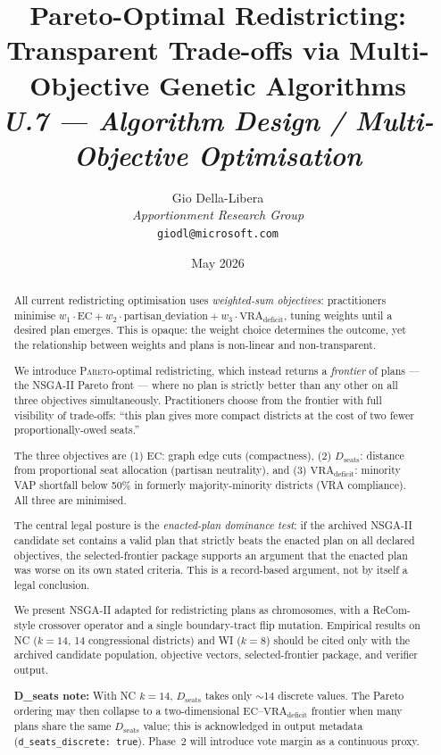 \documentclass[12pt]{article}
\title{%
  \textbf{Pareto-Optimal Redistricting:}\\
  \textbf{Transparent Trade-offs via Multi-Objective Genetic Algorithms}\\[0.8em]
  \normalsize\textit{U.7 --- Algorithm Design / Multi-Objective Optimisation}%
}
\author{%
  Gio Della-Libera\\
  \textit{Apportionment Research Group}\\
  \small\texttt{giodl@microsoft.com}
}
\date{May 2026}
\newcommand{\pareto}{\textsc{Pareto}}
\newcommand{\EC}{\ensuremath{\mathrm{EC}}}
\newcommand{\Dseats}{\ensuremath{D_{\mathrm{seats}}}}
\newcommand{\VRA}{\ensuremath{\mathrm{VRA}_{\mathrm{deficit}}}}
\begin{document}
\maketitle

\begin{abstract}
\noindent
All current redistricting optimisation uses \emph{weighted-sum objectives}: practitioners
minimise $w_1 \cdot \EC + w_2 \cdot \text{partisan\_deviation} + w_3 \cdot \VRA$,
tuning weights until a desired plan emerges.
This is opaque: the weight choice determines the outcome, yet the relationship
between weights and plans is non-linear and non-transparent.

We introduce \pareto{}-optimal redistricting, which instead returns a
\emph{frontier} of plans --- the NSGA-II Pareto front --- where no plan is
strictly better than any other on all three objectives simultaneously.
Practitioners choose from the frontier with full visibility of trade-offs:
``this plan gives more compact districts at the cost of two fewer
proportionally-owed seats.''

The three objectives are (1) \EC: graph edge cuts (compactness),
(2) $\Dseats$: distance from proportional seat allocation (partisan
neutrality), and (3) $\VRA$: minority VAP shortfall below 50\% in
formerly majority-minority districts (VRA compliance).
All three are minimised.

The central legal posture is the \emph{enacted-plan dominance test}: if the
archived NSGA-II candidate set contains a valid plan that strictly beats the
enacted plan on all declared objectives, the selected-frontier package supports
an argument that the enacted plan was worse on its own stated criteria.  This is
a record-based argument, not by itself a legal conclusion.

We present NSGA-II adapted for redistricting plans as chromosomes, with a
ReCom-style crossover operator and a single boundary-tract flip mutation.
Empirical results on NC ($k=14$, 14 congressional districts) and WI ($k=8$)
should be cited only with the archived candidate population, objective vectors,
selected-frontier package, and verifier output.

\textbf{D\_seats note:} With NC $k=14$, $\Dseats$ takes only $\sim$14 discrete
values.  The Pareto ordering may then collapse to a two-dimensional
$\EC$--$\VRA$ frontier when many plans share the same $\Dseats$ value;
this is acknowledged in output metadata (\texttt{d\_seats\_discrete: true}).
Phase~2 will introduce vote margin as a continuous proxy.
\end{abstract}

\tableofcontents
\newpage











\end{document}
